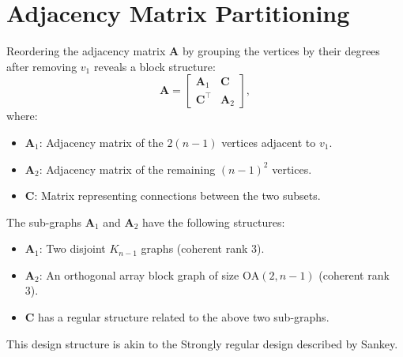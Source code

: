 \documentclass{article}
\begin{document}
\section{Adjacency Matrix Partitioning}

Reordering the adjacency matrix \( \mathbf{A} \) by grouping the vertices by their degrees after removing \( v_1 \) reveals a block structure:
\[
\mathbf{A} =
\begin{bmatrix}
\mathbf{A}_1 & \mathbf{C} \\
\mathbf{C}^\top & \mathbf{A}_2
\end{bmatrix},
\]
where:
\begin{itemize}
    \item \( \mathbf{A}_1 \): Adjacency matrix of the \( 2(n-1) \) vertices adjacent to \( v_1 \).
    \item \( \mathbf{A}_2 \): Adjacency matrix of the remaining \( (n-1)^2 \) vertices.
    \item \( \mathbf{C} \): Matrix representing connections between the two subsets.
\end{itemize}

The sub-graphs \( \mathbf{A}_1 \) and \( \mathbf{A}_2 \) have the following structures:
\begin{itemize}
    \item \( \mathbf{A}_1 \): Two disjoint \( K_{n-1} \) graphs (coherent rank 3).
    \item \( \mathbf{A}_2 \): An orthogonal array block graph of size \( \text{OA}(2, n-1) \) (coherent rank 3).
    \item \( \mathbf{C} \) has a regular structure related to the above two sub-graphs.
\end{itemize}

This design structure is akin to the Strongly regular design described by Sankey\cite{sankey_srd}.

\end{document}
